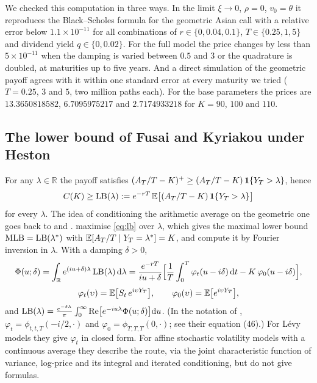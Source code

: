 We checked this computation in three ways. In the limit $\xi\to0$, $\rho=0$, $v_0=\theta$ it reproduces the
Black--Scholes formula for the geometric Asian call with a relative error below $1.1\times10^{-11}$ for all
combinations of $r\in\{0,0.04,0.1\}$, $T\in\{0.25,1,5\}$ and dividend yield $q\in\{0,0.02\}$. For the full
model the price changes by less than $5\times10^{-11}$ when the damping is varied between $0.5$ and $3$ or
the quadrature is doubled, at maturities up to five years. And a direct simulation of the geometric payoff agrees with it within one standard error at every
maturity we tried ($T=0.25$, $3$ and $5$, two million paths each). For the base parameters
the prices are $13.3650818582$, $6.7095975217$ and $2.7174933218$ for $K=90$, $100$ and $110$.

\subsection{The lower bound of Fusai and Kyriakou under Heston}\label{sec:fk}

For any $\lambda\in\mathbb R$ the payoff satisfies $(A_T/T-K)^+ \ge (A_T/T-K)\,\mathbf{1}\{Y_T>\lambda\}$, hence
\begin{equation}\label{eq:lb}
C(K) \ge \mathrm{LB}(\lambda) := e^{-rT}\,\mathbb{E}\bigl[(A_T/T-K)\,\mathbf{1}\{Y_T>\lambda\}\bigr]
\end{equation}
for every $\lambda$. The idea of conditioning the arithmetic average on the geometric one goes back to
\citet{Curran1994} and \citet{RogersShi1995}. \citet{FusaiKyriakou2016} maximise \eqref{eq:lb} over
$\lambda$, which gives the maximal lower bound $\mathrm{MLB} = \mathrm{LB}(\lambda^\ast)$ with
$\mathbb{E}[A_T/T \mid Y_T=\lambda^\ast]=K$, and compute it by Fourier inversion in $\lambda$. With a damping
$\delta>0$,
\begin{equation}\label{eq:Phi}
\Phi(u;\delta) = \int_{\mathbb R} e^{(iu+\delta)\lambda}\,\mathrm{LB}(\lambda)\,\mathrm{d}\lambda
= \frac{e^{-rT}}{iu+\delta}\Bigl[\frac1T\int_0^T\varphi_t(u-i\delta)\,\mathrm{d} t - K\,\varphi_0(u-i\delta)\Bigr],
\end{equation}
\begin{equation}\label{eq:phis}
\varphi_t(\upsilon) = \mathbb{E}\bigl[S_t\,e^{i\upsilon Y_T}\bigr],\qquad \varphi_0(\upsilon) = \mathbb{E}\bigl[e^{i\upsilon Y_T}\bigr],
\end{equation}
and $\mathrm{LB}(\lambda) = \frac{e^{-\delta\lambda}}{\pi}\int_0^\infty \mathrm{Re}\bigl[e^{-iu\lambda}\Phi(u;\delta)\bigr]\mathrm{d} u$.
(In the notation of \citet{FusaiKyriakou2016}, $\varphi_t=\phi_{t,t,T}(-i/2,\cdot)$ and
$\varphi_0=\phi_{T,T,T}(0,\cdot)$; see their equation (46).) For L\'evy models they give $\varphi_t$ in
closed form. For affine stochastic volatility models with a continuous average they describe the route,
via the joint characteristic function of variance, log-price and its integral and iterated conditioning,
but do not give formulas.

